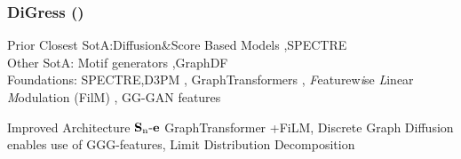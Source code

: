\documentclass[./presentation.tex]{subfiles}
\begin{document}
\begin{frame}[t,label=digressintro]
  \frametitle{DiGress (\cite{vignacDiGressDiscreteDenoising2023b})}
  \vspace{-1cm}
\footnotesize
\begin{priorart}
{\footnotesize
    Prior Closest SotA:Diffusion\&Score Based Models \citep{niuPermutationInvariantGraph2020b,songGenerativeModelingEstimating2019b},SPECTRE \citep{martinkusSPECTRESpectralConditioning2022b}\\
    Other SotA: Motif generators \citep{maziarzLearningExtendMolecular2021},GraphDF\citep{luoGraphDFDiscreteFlow2021d}
\\
Foundations: SPECTRE,D3PM \citep{austinStructuredDenoisingDiffusion2021e}, GraphTransformers \citep{vaswaniAttentionAllYou2017c,yunGraphTransformerNetworks2019b}, \textit{F}eaturew\textit{i}se \textit{L}inear \textit{M}odulation (FilM) \citep{perezFiLMVisualReasoning2018b}, GG-GAN features
 }
  \end{priorart}
  \vspace{-0.25cm}
  \begin{contributions}
    Improved Architecture $\operatorname{\mathbf{S}_n\mathbf{-e}}$ GraphTransformer +FiLM, Discrete Graph Diffusion enables use of GGG-features, Limit Distribution Decomposition
  \end{contributions}
  \vspace{-0.25cm}
  \begin{columns}
        \footnotesize
    \begin{column}{0.5\textwidth}
      \begin{outcomes}
      \end{outcomes} 
    \end{column}
    \begin{column}{0.5\textwidth}
      \begin{impact} 
      \end{impact} 
    \end{column}
  \end{columns}
  
\end{frame}
\end{document}
